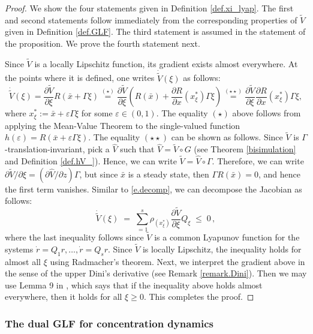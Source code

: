 \documentclass[onefignum,onetabnum]{siamonline220329}
\newcommand\bx{{\bar x}}
\newcommand{\tV}{{\widetilde{V}}}
\newcommand{\hV}{{\widehat{V}}}
\newcommand\ve{\varepsilon}
\def\ell{}%
\begin{document}
{\begin{proof} 

 
We show the four statements given in Definition \ref{def.xi_lyap}. The first and second statements follow immediately from the corresponding properties of $\tV$ given in {Definition} \ref{def.GLF}. The third statement is assumed in the statement of the proposition. We prove the fourth statement next.

Since $\tV$ is a locally Lipschitz function, its gradient exists almost everywhere. At the points where it is defined, one write{s} $\dot \tV(\xi)$ as follows:
\[
\dot\tV(\xi)=\frac{\partial \tV}{\partial \xi} R(\bx+\Gamma \xi) \mathop{=}\limits^{(\star)} \frac{\partial \tV}{\partial \xi}  \left (R(\bx) + \frac{\partial R}{\partial x}(x_\xi^*)\Gamma \xi \right )\mathop{=}\limits^{(\star\star)}  \frac{\partial \tV}{\partial \xi}   \frac{\partial R}{\partial x}(x_\xi^*)\Gamma \xi  , 
\]
where $x_\xi^*:=\bx+\ve \Gamma \xi$ for some $\ve\in(0,1)$. The equality $(\star)$ above follows from applying the Mean-Value Theorem to the single-valued function $h(\ve)=R(\bx+\ve\Gamma \xi)$. 
The equality $(\star\star)$ can be shown as follows.
Since $\tV$ is $\Gamma$-translation-invariant, pick a $\hV$ such that $\hV=\tV \circ G$ (see Theorem \ref{bisimulation} and Definition \ref{def.hV_}). Hence, we can write $\tV=\hV \circ \Gamma$. Therefore, we can write $\partial \tV/\partial \xi=(\partial \hV/\partial z) \Gamma$, but since $\bx$ is a steady state, then $\Gamma R(\bx)=0$, and hence the first term vanishes. Similar to \eqref{e.decomp}, we can decompose the Jacobian as follows:
\[
\dot\tV(\xi) \;=\;  \sum_{\ell=1}^s \rho_\ell(x_\xi^*) \frac{\partial \tV}{\partial \xi}  Q_\ell \xi \;\le\; 0 \,,
\]
where the last inequality follows since $\tV$ is a common Lyapunov function for the systems ${\dot r}=Q_1 r,\dots,\dot r=Q_s r$.  Since $\tV$ is locally Lipschitz, the inequality holds for almost all $\xi$ using Radmacher's theorem. Next, we interpret the gradient above in the sense of the upper Dini's derivative (see Remark \ref{remark.Dini}). Then we may use Lemma 9 in \cite{MA_TAC22}, which says that if the inequality above holds almost everywhere, then it holds for all $\xi\ge 0$. This completes the proof.
\end{proof}
 
\subsubsection{The dual GLF for concentration dynamics}\
\label{sec.dualGLF}
 
}
\end{document}
